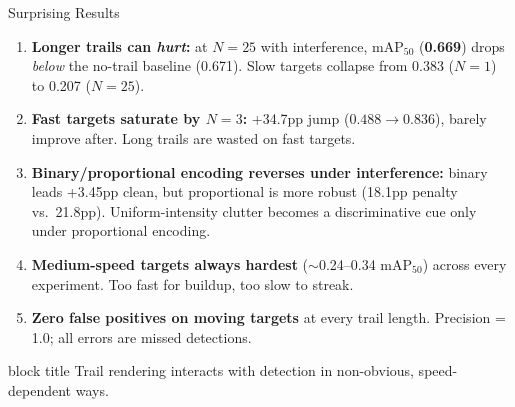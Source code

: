 \documentclass[aspectratio=169, 10pt]{beamer}
\newcommand{\maptf}{\text{mAP}_{50}}
\newcommand{\emphnum}[1]{\textcolor{Garnet}{\textbf{#1}}}
\newcommand{\keypoint}[1]{%
  \vfill
  \begin{beamercolorbox}[wd=\textwidth, dp=0.4em, leftskip=0.3cm]{block title}%
    \small #1%
  \end{beamercolorbox}%
}
\begin{document}
\begin{frame}{Surprising Results}

\begin{enumerate}\setlength{\itemsep}{4pt}
  \item \textbf{Longer trails can \textit{hurt}:} at $N{=}25$ with interference,
        $\maptf$ (\emphnum{0.669}) drops \textit{below} the no-trail baseline (0.671).
        Slow targets collapse from 0.383 ($N{=}1$) to 0.207 ($N{=}25$).

  \item \textbf{Fast targets saturate by $N{=}3$:} +34.7pp jump
        ($0.488 \to 0.836$), barely improve after. Long trails are wasted on fast targets.

  \item \textbf{Binary/proportional encoding reverses under interference:}
        binary leads +3.45pp clean, but proportional is more robust
        (18.1pp penalty vs.\ 21.8pp). Uniform-intensity clutter becomes a
        discriminative cue only under proportional encoding.

  \item \textbf{Medium-speed targets always hardest} ($\sim$0.24--0.34 $\maptf$)
        across every experiment. Too fast for buildup, too slow to streak.

  \item \textbf{Zero false positives on moving targets} at every trail length.
        Precision = 1.0; all errors are missed detections.
\end{enumerate}

\keypoint{Trail rendering interacts with detection in non-obvious, speed-dependent ways.}
\end{frame}
\end{document}

